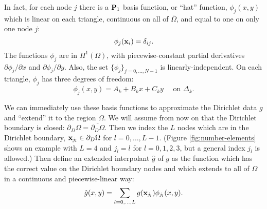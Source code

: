 In fact, for each node $j$ there is a $\mathbf{P}_1$ basis function, or ``hat'' function, $\phi_j(x,y)$ which is linear on each triangle, continuous on all of $\overline{\Omega}$, and equal to one on only one node $j$:%
\begin{equation*}
\phi_j(\mathbf{x}_i) = \delta_{ij}.
\end{equation*}
The functions $\phi_j$ are in $H^1(\Omega)$, with piecewise-constant partial derivatives $\partial\phi_j/\partial x$ and $\partial\phi_j/\partial y$.  Also, the set $\{\phi_j\}_{j=0,\dots,N-1}$ is linearly-independent.  On each triangle, $\phi_j$ has three degrees of freedom:
\begin{equation*}
\phi_j(x,y) = A_k + B_k x + C_k y \quad \text{ on } \Delta_k.
\end{equation*}

We can immediately use these basis functions to approximate the Dirichlet data $g$ and ``extend'' it to the region $\Omega$.  We will assume from now on that the Dirichlet boundary is closed: $\partial_D\Omega = \overline{\partial_D\Omega}$.  Then we index the $L$ nodes which are in the Dirichlet boundary, $\mathbf{x}_{j_l} \in \partial_D\Omega$ for $l=0,\dots,L-1$.  (Figure \ref{fig:number-elements} shows an example with $L=4$ and $j_l=l$ for $l=0,1,2,3$, but a general index $j_l$ is allowed.)  Then define an extended interpolant $\hat g$ of $g$ as the function which has the correct value on the Dirichlet boundary nodes and which extends to all of $\Omega$ in a continuous and piecewise-linear way:
\begin{equation}
\hat g(x,y) = \sum_{l=0,\dots,L} g(\mathbf{x}_{j_l}) \phi_{j_l}(x,y). \label{hatgdefine}
\end{equation}

